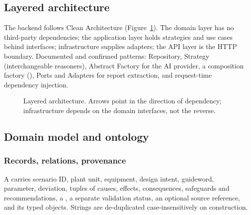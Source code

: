 \documentclass[10pt,twocolumn,a4paper]{extarticle}
\begin{document}
\subsection{Layered architecture}
The backend follows Clean Architecture (Figure~\ref{fig:arch}). The domain layer has no third-party dependencies; the application layer holds strategies and use cases behind interfaces; infrastructure supplies adapters; the API layer is the HTTP boundary. Documented and confirmed patterns: Repository, Strategy (interchangeable reasoners), Abstract Factory for the AI provider, a composition factory (), Ports and Adapters for report extraction, and request-time dependency injection.

\begin{figure}[t]
\centering
{}
\caption{Layered architecture. Arrows point in the direction of dependency; infrastructure depends on the domain interfaces, not the reverse.}
\label{fig:arch}
\end{figure}

\subsection{Domain model and ontology}
\subsubsection{Records, relations, provenance}
A  carries scenario ID, plant unit, equipment, design intent, guideword, parameter, deviation, tuples of causes, effects, consequences, safeguards and recommendations, a , a separate validation status, an optional source reference, and its typed  objects. Strings are de-duplicated case-insensitively on construction.
\end{document}
